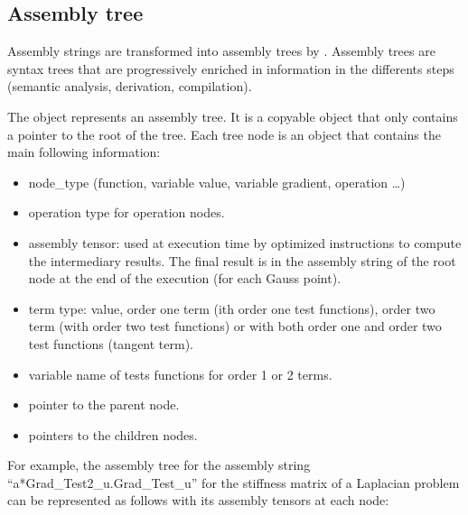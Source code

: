 \documentclass[a4paper,11pt,english]{sphinxmanual}
\begin{document}
\subsection{Assembly tree}
\label{\detokenize{project/libdesc_high_gen_assemb:assembly-tree}}
Assembly strings are transformed into assembly trees by . Assembly trees are syntax trees that are progressively enriched in information in the differents steps (semantic analysis, derivation, compilation).

The object  represents an assembly tree. It is a copyable object that only contains a pointer to the root of the tree. Each tree node is an object  that contains the main following information:
\begin{itemize}
\item {} 
node\_type (function, variable value, variable gradient, operation …)

\item {} 
operation type for operation nodes.

\item {} 
assembly tensor: used at execution time by optimized instructions to compute the intermediary results. The final result is in the assembly string of the root node at the end of the execution (for each Gauss point).

\item {} 
term type: value, order one term (ith order one test functions),
order two term (with order two test functions) or with both order one and
order two test functions (tangent term).

\item {} 
variable name of tests functions for order 1 or 2 terms.

\item {} 
pointer to the parent node.

\item {} 
pointers to the children nodes.

\end{itemize}

For example, the assembly tree for the assembly string “a*Grad\_Test2\_u.Grad\_Test\_u” for the stiffness matrix of a Laplacian problem can be represented as follows with its assembly tensors at each node:

\begin{figure}[htbp]
\centering

\noindent{}
\end{figure}
\end{document}
